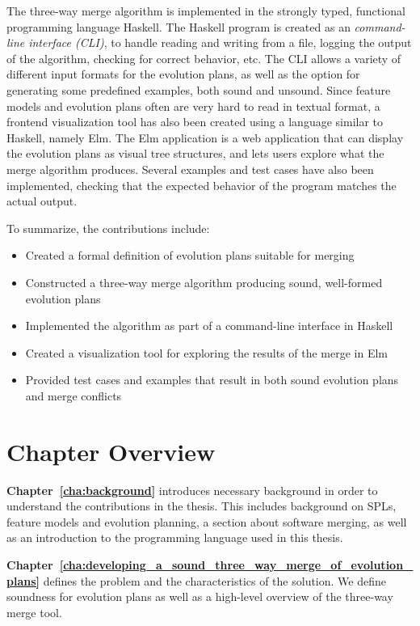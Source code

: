 \documentclass[a4paper,english]{ifimaster}
\begin{document}
The three-way merge algorithm is implemented in the strongly typed, functional programming language Haskell. The Haskell program is created as an \textit{command-line interface (CLI)}, to handle reading and writing from a file, logging the output of the algorithm, checking for correct behavior, etc. The CLI allows a variety of different input formats for the evolution plans, as well as the option for generating some predefined examples, both sound and unsound. Since feature models and evolution plans often are very hard to read in textual format, a frontend visualization tool has also been created using a language similar to Haskell, namely Elm. The Elm application is a web application that can display the evolution plans as visual tree structures, and lets users explore what the merge algorithm produces. Several examples and test cases have also been implemented, checking that the expected behavior of the program matches the actual output.

To summarize, the contributions include:

\begin{itemize}
  \item Created a formal definition of evolution plans suitable for merging
  \item Constructed a three-way merge algorithm producing sound, well-formed evolution plans
  \item Implemented the algorithm as part of a command-line interface in Haskell
  \item Created a visualization tool for exploring the results of the merge in Elm
  \item Provided test cases and examples that result in both sound evolution plans and merge conflicts
\end{itemize}

\section{Chapter Overview}%
\label{sec:chapter_overview}

\textbf{Chapter~\ref{cha:background}} introduces necessary background in order to understand the contributions in the thesis. This includes background on SPLs, feature models and evolution planning, a section about software merging, as well as an introduction to the programming language used in this thesis.

\textbf{Chapter~\ref{cha:developing_a_sound_three_way_merge_of_evolution_plans}} defines the problem and the characteristics of the solution. We define soundness for evolution plans as well as a high-level overview of the three-way merge tool.
\end{document}
